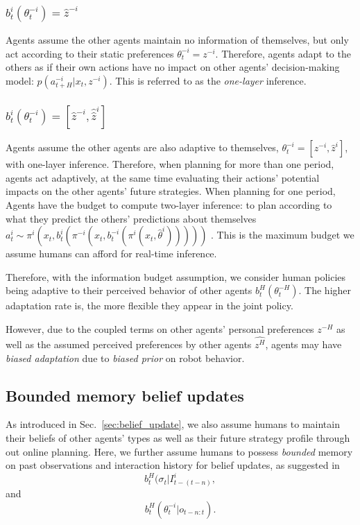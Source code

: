 \documentclass[letterpaper, 10 pt, conference]{ieeeconf}  %
\begin{document}
\subsubsection{$b^i_t(\theta^{-i}_t) = \hat{z}^{-i}$}
Agents assume the other agents maintain no information of themselves, but only 
act according to their static preferences $\theta^{-i}_t = z^{-i}$. Therefore, 
agents adapt to the others as if their own actions have no impact on other 
agents' decision-making model: $p(a^{-i}_{t+H}|x_t, z^{-i})$. This is referred 
to as the \textit{one-layer} inference.

\subsubsection{$b^i_t(\theta^{-i}_t) = 
[\hat{z}^{-i}, 
\hat{\hat{z}}^i]$}
Agents assume the other agents are also adaptive to themselves,
$\theta^{-i}_t = [z^{-i},
\hat{z}^{i}]$, with one-layer inference. 
Therefore, when planning for more than one period, agents act adaptively, at 
the same time evaluating their actions' potential impacts on the other agents' future 
strategies. When planning for one period, Agents have the budget to compute 
two-layer inference: to plan according to what they predict the others' 
predictions about themselves 
$a^i_t \sim \pi^i(x_t, b^i_t(\pi^{-i}(x_t,b^{-i}_t(\pi^i(x_t,\hat{\theta}^i)))))$
. This is the maximum budget we assume humans can afford for real-time 
inference.

Therefore, with the information budget assumption, we consider human policies 
being adaptive to their perceived behavior of other agents 
$b^H_t(\theta^{-H}_t)$. The higher adaptation rate is, the more flexible they 
appear in the joint policy. 

However, due to the coupled terms on other agents' personal preferences $z^{-H}$ 
as well as the assumed perceived preferences by other agents $\hat{z^{H}}$, 
agents may have \textit{biased adaptation} due to \textit{biased prior} on 
robot behavior.  

\subsection{Bounded memory belief updates}
As introduced in Sec.~\ref{sec:belief_update}, we also assume humans to maintain their 
beliefs of other agents' types as well as their future strategy profile 
through out online planning. 
Here, we further assume humans to possess \textit{bounded} memory on past observations and 
interaction history for belief updates, as suggested in \cite{nikolaidis2016formalizing} 
$$
b^H_t(\sigma_{t}|I^i_{t-(t-n)},
$$
and
$$
b^H_t(\theta^{-i}_t|o_{t-n:t}).
$$
\end{document}
